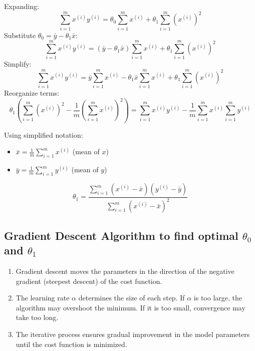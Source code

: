 Expanding:
\[
\sum_{i=1}^m x^{(i)} y^{(i)} = \theta_0 \sum_{i=1}^m x^{(i)} + \theta_1 \sum_{i=1}^m \left( x^{(i)} \right)^2
\]
Substitute \(\theta_0 = \bar{y} - \theta_1 \bar{x}\):
\[
\sum_{i=1}^m x^{(i)} y^{(i)} = (\bar{y} - \theta_1 \bar{x}) \sum_{i=1}^m x^{(i)} + \theta_1 \sum_{i=1}^m (x^{(i)})^2
\]
Simplify:
\[
\sum_{i=1}^m x^{(i)} y^{(i)} = \bar{y} \sum_{i=1}^m x^{(i)} - \theta_1 \bar{x} \sum_{i=1}^m x^{(i)} + \theta_1 \sum_{i=1}^m (x^{(i)})^2
\]
Reorganize terms:
\[
\theta_1 \left( \sum_{i=1}^m (x^{(i)})^2 - \frac{1}{m} \left( \sum_{i=1}^m x^{(i)} \right)^2 \right) = \sum_{i=1}^m x^{(i)} y^{(i)} - \frac{1}{m} \sum_{i=1}^m x^{(i)} \sum_{i=1}^m y^{(i)}
\]

Using simplified notation:
\begin{itemize}
    \item \( \bar{x} = \frac{1}{m} \sum_{i=1}^m x^{(i)} \) (mean of \(x\))
    \item \( \bar{y} = \frac{1}{m} \sum_{i=1}^m y^{(i)} \) (mean of \(y\))
\end{itemize}

\begin{equation}
\theta_1 = \frac{\sum_{i=1}^m \left( x^{(i)} - \bar{x} \right) \left( y^{(i)} - \bar{y} \right)}{\sum_{i=1}^m \left( x^{(i)} - \bar{x} \right)^2}
\end{equation}

\subsection{Gradient Descent Algorithm to find optimal $\theta_0$ and $\theta_1$}

\begin{enumerate}
    \item Gradient descent moves the parameters in the direction of the negative gradient (steepest descent)
    of the cost function.
    \item The learning rate $\alpha$ determines the size of each step. If $\alpha$ is too large, the algorithm
    may overshoot the minimum. If it is too small, convergence may take too long.
    \item The iterative process ensures gradual improvement in the model parameters until the cost function is minimized.
\end{enumerate}

